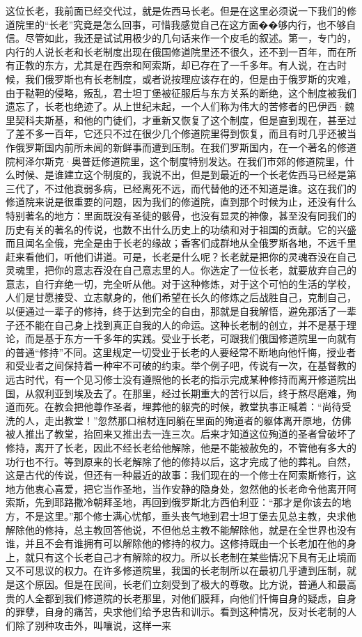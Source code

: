 \par 这位长老，我前面已经交代过，就是佐西马长老。但是在这里必须说一下我们的修道院里的“长老”究竟是怎么回事，可惜我感觉自己在这方面��够内行，也不够自信。尽管如此，我还是试试用极少的几句话来作一个皮毛的叙述。第一，专门的，内行的人说长老和长老制度出现在俄国修道院里还不很久，还不到一百年，而在所有正教的东方，尤其是在西奈和阿索斯，却已存在了一千多年。有人说，在古时候，我们俄罗斯也有长老制度，或者说按理应该存在的，但是由于俄罗斯的灾难，由于鞑靼的侵略，叛乱，君士坦丁堡被征服后与东方关系的断绝，这个制度被我们遗忘了，长老也绝迹了。从上世纪末起，一个人们称为伟大的苦修者的巴伊西·魏里契科夫斯基，和他的门徒们，才重新又恢复了这个制度，但是直到现在，甚至过了差不多一百年，它还只不过在很少几个修道院里得到恢复，而且有时几乎还被当作俄罗斯国内前所未闻的新鲜事而遭到压制。在我们罗斯国内，在一个著名的修道院柯泽尔斯克·奥普廷修道院里，这个制度特别发达。在我们市郊的修道院里，什么时候、是谁建立这个制度的，我说不出，但是到最近的一个长老佐西马已经是第三代了，不过他衰弱多病，已经离死不远，而代替他的还不知道是谁。这在我们的修道院来说是很重要的问题，因为我们的修道院，直到那个时候为止，还没有什么特别著名的地方：里面既没有圣徒的骸骨，也没有显灵的神像，甚至没有同我们的历史有关的著名的传说，也数不出什么历史上的功绩和对于祖国的贡献。它的兴盛而且闻名全俄，完全是由于长老的缘故；香客们成群地从全俄罗斯各地，不远千里赶来看他们，听他们讲道。可是，长老是什么呢？长老就是把你的灵魂吞没在自己灵魂里，把你的意志吞没在自己意志里的人。你选定了一位长老，就要放弃自己的意志，自行弃绝一切，完全听从他。对于这种修炼，对于这个可怕的生活的学校，人们是甘愿接受、立志献身的，他们希望在长久的修炼之后战胜自己，克制自己，以便通过一辈子的修持，终于达到完全的自由，那就是自我解悟，避免那活了一辈子还不能在自己身上找到真正自我的人的命运。这种长老制的创立，并不是基于理论，而是基于东方一千多年的实践。受业于长老，可跟我们俄国修道院里一向就有的普通“修持”不同。这里规定一切受业于长老的人要经常不断地向他忏悔，授业者和受业者之间保持着一种牢不可破的约束。举个例子吧，传说有一次，在基督教的远古时代，有一个见习修士没有遵照他的长老的指示完成某种修持而离开修道院出国，从叙利亚到埃及去了。在那里，经过长期重大的苦行以后，终于熬尽磨难，殉道而死。在教会把他尊作圣者，埋葬他的躯壳的时候，教堂执事正喊着：“尚待受洗的人，走出教堂！”忽然那口棺材连同躺在里面的殉道者的躯体离开原地，仿佛被人推出了教堂，抬回来又推出去一连三次。后来才知道这位殉道的圣者曾破坏了修持，离开了长老，因此不经长老给他解除，他是不能被赦免的，不管他有多大的功行也不行。等到原来的长老解除了他的修持以后，这才完成了他的葬礼。自然，这是古代的传说，但还有一种最近的故事：我们现在的一个修士在阿索斯修行，这地方他衷心喜爱，把它当作圣地，当作安静的隐身处，忽然他的长老命令他离开阿索斯，先到耶路撒冷朝拜圣地，再回到俄罗斯北方西伯利亚：“那才是你该去的地方，不是这里。”那个修士满心忧郁，垂头丧气地到君士坦丁堡去见总主教，央求他解除他的修持，总主教回答他说，不但他总主教不能解除他，就是在全世界也没有谁，并且不会有谁拥有可以解除他的修持的权力。这修持既由一个长老加在他的身上，就只有这个长老自己才有解除的权力。所以长老制在某些情况下具有无止境而又不可思议的权力。在许多修道院里，我国的长老制所以在最初几乎遭到压制，就是这个原因。但是在民间，长老们立刻受到了极大的尊敬。比方说，普通人和最高贵的人全都到我们修道院的长老那里，对他们膜拜，向他们忏悔自身的疑虑，自身的罪孽，自身的痛苦，央求他们给予忠告和训示。看到这种情况，反对长老制的人们除了别种攻击外，叫嚷说，这样一来